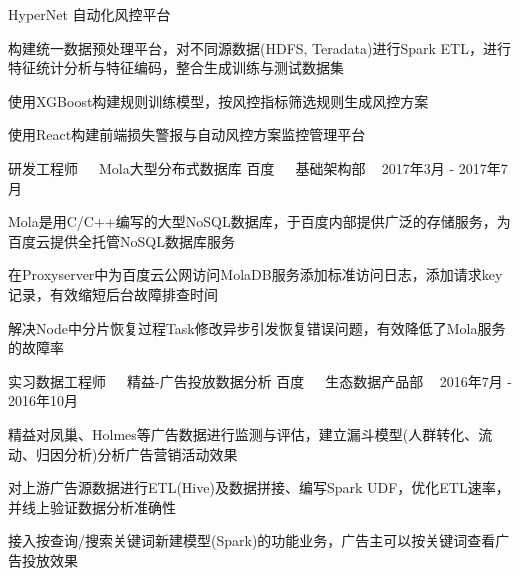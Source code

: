 \documentclass[11pt, a4paper, UTF8]{awesome-cv}
\begin{document}
\begin{cventries}
  \cventry
    {HyperNet 自动化风控平台} %
    {} %
    {} %
    {\ } %
    {
      \begin{cvitems} %
        \item {构建统一数据预处理平台，对不同源数据(HDFS, Teradata)进行Spark ETL，进行特征统计分析与特征编码，整合生成训练与测试数据集}
        \item {使用XGBoost构建规则训练模型，按风控指标筛选规则生成风控方案}
        \item {使用React构建前端损失警报与自动风控方案监控管理平台}
      \end{cvitems}
    }
    
  \cventry
    {研发工程师{\ \cdotp\ \ }Mola大型分布式数据库} %
    {百度{\ \cdotp\ \ }基础架构部} %
    {\ } %
    {2017年3月 - 2017年7月} %
    {
      \begin{cvitems} %
        \item {Mola是用C/C++编写的大型NoSQL数据库，于百度内部提供广泛的存储服务，为百度云提供全托管NoSQL数据库服务}
        \item {在Proxyserver中为百度云公网访问MolaDB服务添加标准访问日志，添加请求key记录，有效缩短后台故障排查时间}
        \item {解决Node中分片恢复过程Task修改异步引发恢复错误问题，有效降低了Mola服务的故障率}
      \end{cvitems}
    }

  \cventry
    {实习数据工程师{\ \cdotp\ \ }精益-广告投放数据分析} %
    {百度{\ \cdotp\ \ }生态数据产品部} %
    {\ } %
    {2016年7月 - 2016年10月} %
    {
      \begin{cvitems} %
        \item {精益对凤巢、Holmes等广告数据进行监测与评估，建立漏斗模型(人群转化、流动、归因分析)分析广告营销活动效果}
        \item {对上游广告源数据进行ETL(Hive)及数据拼接、编写Spark UDF，优化ETL速率，并线上验证数据分析准确性}
        \item {接入按查询/搜索关键词新建模型(Spark)的功能业务，广告主可以按关键词查看广告投放效果}
      \end{cvitems}
    }
        

\end{cventries}
\end{document}
